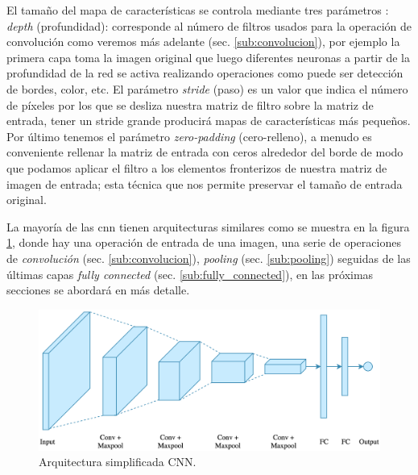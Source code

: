 El tamaño del mapa de características se controla mediante tres parámetros \citep{cnnsarticle}: \textit{depth} (profundidad): corresponde al número de filtros usados para la operación de convolución como veremos más adelante (sec. \ref{sub:convolucion}), por ejemplo la primera capa toma la imagen original que luego diferentes neuronas a partir de la profundidad de la red se activa realizando operaciones como puede ser detección de bordes, color, etc. El parámetro \textit{stride} (paso) es un valor que indica el número de píxeles por los que se desliza nuestra matriz de filtro sobre la matriz de entrada, tener un stride grande producirá mapas de características más pequeños. Por último tenemos el parámetro \textit{zero-padding} (cero-relleno), a menudo es conveniente rellenar la matriz de entrada con ceros alrededor del borde de modo que podamos aplicar el filtro a los elementos fronterizos de nuestra matriz de imagen de entrada; esta técnica que nos permite preservar el tamaño de entrada original.

La mayoría de las \ac{cnn} tienen arquitecturas similares como se muestra en la figura \ref{Fig:cnn_network}, donde hay una operación de entrada de una imagen, una serie de operaciones de  \textit{convolución} (sec. \ref{sub:convolucion}),  \textit{pooling} (sec. \ref{sub:pooling}) seguidas de las últimas capas \textit{fully connected} (sec. \ref{sub:fully_connected}), en las próximas secciones se abordará en más detalle. 

\begin{figure}[H]\centering
  \includegraphics[scale=0.2,keepaspectratio=true,clip=true]{imagenes/MarcoTeorico/cnn_intuition.png}
  \caption{Arquitectura simplificada CNN.}
  \label{Fig:cnn_network}
\end{figure}




